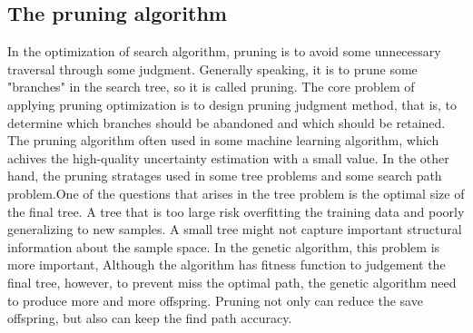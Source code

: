 \documentclass[12pt]{article}
\begin{document}
\subsection{The pruning algorithm}
  

In the optimization of search algorithm, pruning is to avoid some unnecessary traversal through some judgment. Generally speaking, it is to prune some "branches" in the search tree, so it is called pruning. The core problem of applying pruning optimization is to design pruning judgment method, that is, to determine which branches should be abandoned and which should be retained. The pruning algorithm often used in some machine learning algorithm\cite{Hu2019}, which achives the high-quality uncertainty estimation with a small value. In the other hand, the pruning stratages used in some tree problems and some search path problem.One of the questions that arises in the tree problem is the optimal size of the final tree. A tree that is too large risk overfitting the training data and poorly generalizing to new samples. A small tree might not capture important structural information about the sample space. In the genetic algorithm, this problem is more important, Although the algorithm has fitness function to judgement the final tree, however, to prevent miss the optimal path, the genetic algorithm need to produce more and more offspring. Pruning not only can reduce the save offspring, but also can keep the find path accuracy. 
\end{document}
